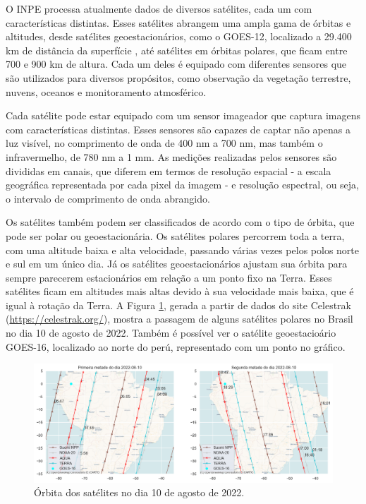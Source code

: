 \documentclass[cic,tc]{iiufrgs}
\begin{document}
O INPE processa atualmente dados de diversos satélites, cada um com características distintas. Esses satélites abrangem uma ampla gama de órbitas e altitudes, desde satélites geoestacionários, como o GOES-12, localizado a 29.400 km de distância da superfície \citep{GOES12Algo}, até satélites em órbitas polares, que ficam entre 700 e 900 km de altura. Cada um deles é equipado com diferentes sensores que são utilizados para diversos propósitos, como observação da vegetação terrestre, nuvens, oceanos e monitoramento atmosférico. \par

Cada satélite pode estar equipado com um sensor imageador que captura imagens com características distintas. Esses sensores são capazes de captar não apenas a luz visível, no comprimento de onda de 400 nm a 700 nm, mas também o infravermelho, de 780 nm a 1 mm. As medições realizadas pelos sensores são divididas em canais, que diferem em termos de resolução espacial - a escala geográfica representada por cada pixel da imagem - e resolução espectral, ou seja, o intervalo de comprimento de onda abrangido. \par

Os satélites também podem ser classificados de acordo com o tipo de órbita, que pode ser polar ou geoestacionária. Os satélites polares percorrem toda a terra, com uma altitude baixa e alta velocidade, passando várias vezes pelos polos norte e sul em um único dia. Já os satélites geoestacionários ajustam sua órbita para sempre parecerem estacionários em relação a um ponto fixo na Terra. Esses satélites ficam em altitudes mais altas devido à sua velocidade mais baixa, que é igual à rotação da Terra. A Figura \ref{fig:orbita2022-08-10}, gerada a partir de dados do site Celestrak (\url{https://celestrak.org/}), mostra a passagem de alguns satélites polares no Brasil no dia 10 de agosto de 2022. Também é possível ver o satélite geoestacioário GOES-16, localizado ao norte do perú, representado com um ponto no gráfico. \par

\begin{figure}[!htb]
    \caption{Órbita dos satélites no dia 10 de agosto de 2022.}
    \begin{center}
        \includegraphics[width=35em]{orbita2022-08-10}
    \end{center}
    \label{fig:orbita2022-08-10}
\end{figure}
\end{document}
